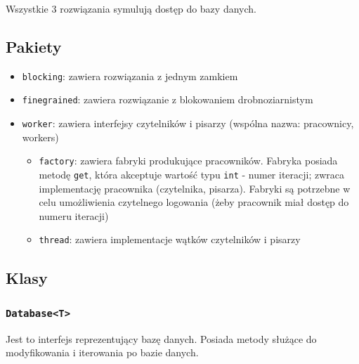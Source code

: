 \documentclass[11pt]{article}
\providecommand{\tightlist}{%
      \setlength{\itemsep}{0pt}\setlength{\parskip}{0pt}}
\begin{document}
Wszystkie 3 rozwiązania symulują dostęp do bazy danych.

    \hypertarget{pakiety}{%
\subsection{Pakiety}\label{pakiety}}

\begin{itemize}
\tightlist
\item
  \texttt{blocking}: zawiera rozwiązania z jednym zamkiem
\item
  \texttt{finegrained}: zawiera rozwiązanie z blokowaniem
  drobnoziarnistym
\item
  \texttt{worker}: zawiera interfejsy czytelników i pisarzy (wspólna
  nazwa: pracownicy, workers)

  \begin{itemize}
  \tightlist
  \item
    \texttt{factory}: zawiera fabryki produkujące pracowników. Fabryka
    posiada metodę \texttt{get}, która akceptuje wartość typu
    \texttt{int} - numer iteracji; zwraca implementację pracownika
    (czytelnika, pisarza). Fabryki są potrzebne w celu umożliwienia
    czytelnego logowania (żeby pracownik miał dostęp do numeru iteracji)
  \item
    \texttt{thread}: zawiera implementacje wątków czytelników i pisarzy
  \end{itemize}
\end{itemize}

    \hypertarget{klasy}{%
\subsection{Klasy}\label{klasy}}

    \hypertarget{databaset}{%
\subsubsection{\texorpdfstring{\texttt{Database\textless{}T\textgreater{}}}{Database\textless T\textgreater{}}}\label{databaset}}

Jest to interfejs reprezentujący bazę danych. Posiada metody służące do
modyfikowania i iterowania po bazie danych.
\end{document}
